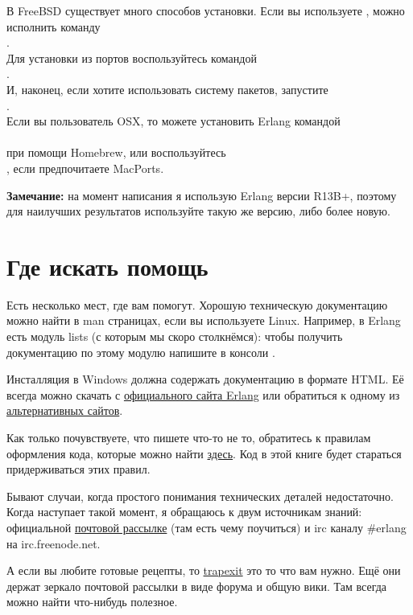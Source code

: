 В FreeBSD существует много способов установки.
Если вы используете , можно исполнить команду\\ 
.\\ 
Для установки из портов воспользуйтесь командой\\ 
.\\ 
И, наконец, если хотите использовать систему пакетов, запустите\\  
.\\ 
Если вы пользователь OSX, то можете установить Erlang командой\\ 
\\ 
при помощи Homebrew, или воспользуйтесь\\ 
, если предпочитаете MacPorts.\\ 
\colorbox{lgray}
{
\begin{minipage}{1.0\linewidth}
\textbf{Замечание:} на момент написания я использую Erlang версии R13B+, поэтому для наилучших результатов используйте такую же версию, либо более новую.
\end{minipage}
}
\section{Где искать помощь}
\label{where-to-get-help}
Есть несколько мест, где вам помогут.
Хорошую техническую документацию можно найти в man страницах, если вы используете Linux.
Например, в Erlang есть модуль lists (с которым мы скоро столкнёмся): чтобы получить документацию по этому модулю напишите в консоли .

Инсталляция в Windows должна содержать документацию в формате HTML.
Её всегда можно скачать с \href{http://erlang.org/doc/}{официального сайта Erlang} или обратиться к одному из \href{http://erldocs.com}{альтернативных сайтов}.

Как только почувствуете, что пишете что\--то не то, обратитесь к правилам оформления кода, которые можно найти \href{http://www.erlang.se/doc/programming_rules.shtml}{здесь}.
Код в этой книге будет стараться придерживаться этих правил.

Бывают случаи, когда простого понимания технических деталей недостаточно.
Когда наступает такой момент, я обращаюсь к двум источникам знаний: официальной \href{http://www.erlang.org/static/doc/mailinglist.html}{почтовой рассылке} (там есть чему поучиться) и irc каналу \#erlang на irc.freenode.net.

А если вы любите готовые рецепты, то \href{http://trapexit.org}{trapexit} это то что вам нужно.
Ещё они держат зеркало почтовой рассылки в виде форума и общую вики.
Там всегда можно найти что\--нибудь полезное.

